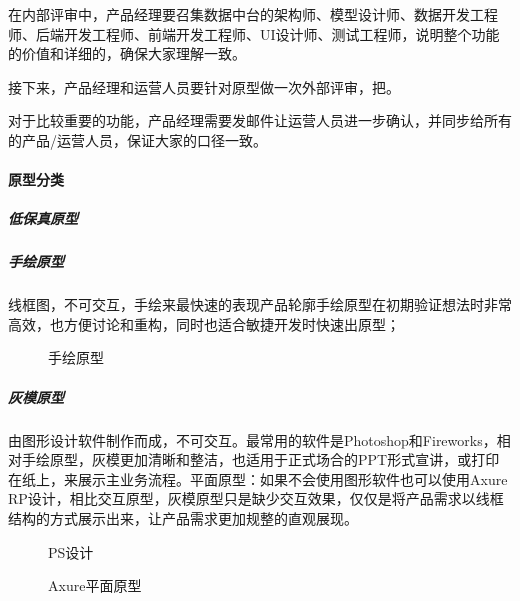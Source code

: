 \documentclass[letterpaper,10pt,english]{sphinxmanual}
\begin{document}
在内部评审中，产品经理要召集数据中台的架构师、模型设计师、数据开发工程师、后端开发工程师、前端开发工程师、UI设计师、测试工程师，说明整个功能的价值和详细的，确保大家理解一致。

接下来，产品经理和运营人员要针对原型做一次外部评审，把。

对于比较重要的功能，产品经理需要发邮件让运营人员进一步确认，并同步给所有的产品/运营人员，保证大家的口径一致。


\paragraph{原型分类}
\label{\detokenize{chapter_knowledge/prototype_design:id4}}

\subparagraph{低保真原型}
\label{\detokenize{chapter_knowledge/prototype_design:id5}}

\subparagraph{手绘原型}
\label{\detokenize{chapter_knowledge/prototype_design:id6}}
线框图，不可交互，手绘来最快速的表现产品轮廓手绘原型在初期验证想法时非常高效，也方便讨论和重构，同时也适合敏捷开发时快速出原型；

\begin{figure}[H]
\centering
\capstart

\noindent{}
\caption{手绘原型}\label{\detokenize{chapter_knowledge/prototype_design:id19}}\end{figure}


\subparagraph{灰模原型}
\label{\detokenize{chapter_knowledge/prototype_design:id7}}
由图形设计软件制作而成，不可交互。最常用的软件是Photoshop和Fireworks，相对手绘原型，灰模更加清晰和整洁，也适用于正式场合的PPT形式宣讲，或打印在纸上，来展示主业务流程。平面原型：如果不会使用图形软件也可以使用Axure
RP设计，相比交互原型，灰模原型只是缺少交互效果，仅仅是将产品需求以线框结构的方式展示出来，让产品需求更加规整的直观展现。%
\begin{footnote}[613]\sphinxAtStartFootnote
{}
%
\end{footnote}

\begin{figure}[H]
\centering
\capstart

\noindent{}
\caption{PS设计}\label{\detokenize{chapter_knowledge/prototype_design:id20}}\end{figure}

\begin{figure}[H]
\centering
\capstart

\noindent{}
\caption{Axure平面原型}\label{\detokenize{chapter_knowledge/prototype_design:id21}}\end{figure}
\end{document}
